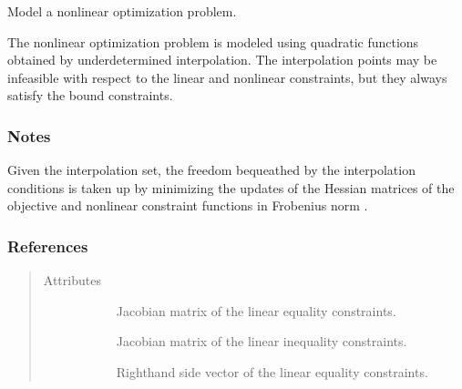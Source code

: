 \documentclass[letterpaper,10pt,english]{sphinxmanual}
\begin{document}
\begin{fulllineitems}
\label{\detokenize{refs/generated/cobyqa.optimize.Models:cobyqa.optimize.Models}}
\sphinxAtStartPar
Model a nonlinear optimization problem.

\sphinxAtStartPar
The nonlinear optimization problem is modeled using quadratic functions
obtained by underdetermined interpolation. The interpolation points may be
infeasible with respect to the linear and nonlinear constraints, but they
always satisfy the bound constraints.
\subsubsection*{Notes}

\sphinxAtStartPar
Given the interpolation set, the freedom bequeathed by the interpolation
conditions is taken up by minimizing the updates of the Hessian matrices of
the objective and nonlinear constraint functions in Frobenius norm .
\subsubsection*{References}

\sphinxAtStartPar
{}
\begin{quote}\begin{description}
\item[{Attributes}] \leavevmode\begin{description}
\item[{}] \leavevmode
\sphinxAtStartPar
Jacobian matrix of the linear equality constraints.

\item[{}] \leavevmode
\sphinxAtStartPar
Jacobian matrix of the linear inequality constraints.

\item[{}] \leavevmode
\sphinxAtStartPar
Right\sphinxhyphen{}hand side vector of the linear equality constraints.


\end{description}
\end{description}
\end{quote}
\end{fulllineitems}
\end{document}
